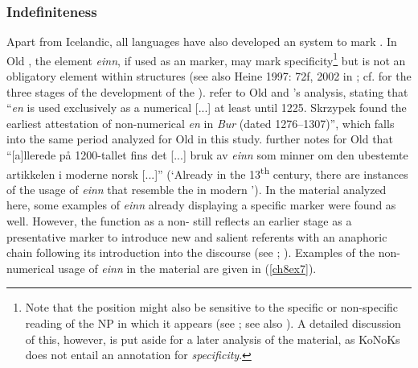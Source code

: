 \documentclass[output=paper,colorlinks,citecolor=brown]{langscibook}
\begin{document}
\subsubsection{Indefiniteness}\label{ch8s3.1.2}
Apart from Icelandic, all  languages have also developed an
 system to mark . In Old , the element
\emph{einn}, if used as an  marker, may mark
specificity\footnote{Note that the  position might also be
  sensitive to the specific or non-specific reading of the NP in which
  it appears (see \citealp[72]{Jacob2005}; see also \citealp{Bosque1996}). A detailed
  discussion of this, however, is put aside for a later analysis of the
  material, as KoNoKs does not entail an annotation for
  \emph{specificity}.} but is not an obligatory element within
 structures (see also Heine 1997: 72f, 2002 in \citealp[51, 53]{Skrzypek2012}; cf. \citealp[142]{Crisma2015} for the three stages of the development of
the  ). \citet[232]{CrismaPintzuk2019} refer to Old
 and \citeauthor{Skrzypek2012}'s \citeyearpar[76, 158]{Skrzypek2012} analysis, stating that
``\emph{en} is used exclusively as a numerical {[}...{]} at least until
1225. Skrzypek found the earliest attestation of non-numerical
\emph{en} in \emph{Bur} (dated 1276--1307)'', which falls into the same
period analyzed for Old  in this study. \citet[387]{Mørck2016}
further notes for Old  that ``{[}a{]}llerede på 1200-tallet
fins det {[}...{]} bruk av \textit{einn} som minner om den ubestemte artikkelen i
moderne norsk {[}...{]}'' (`Already in the 13\textsuperscript{th} century, there are
instances of the usage of \emph{einn} that resemble the 
 in modern '). In the  material analyzed
here, some examples of \emph{einn} already displaying a specific marker
were found as well. However, the function as a non- still
reflects an earlier stage as a presentative marker to introduce new and
salient referents with an anaphoric chain following its introduction
into the discourse (see \citealp[52]{Skrzypek2012}; \citealp[33]{Skrzypek2013}). Examples of the
non-numerical usage of \emph{einn} in the  material are given in
(\ref{ch8ex7}).
\end{document}
